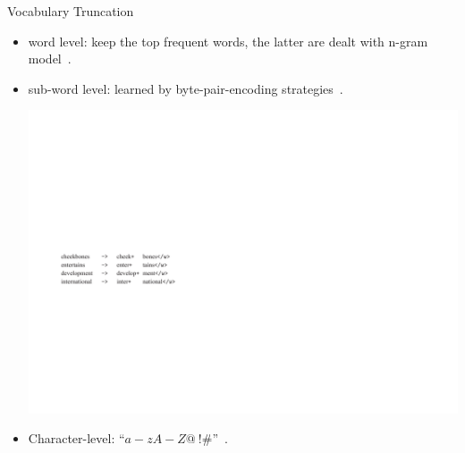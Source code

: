 \documentclass[english]{beamer} %
\begin{document}
\begin{frame}[<+->]{Vocabulary Truncation}
\begin{itemize}
  \item word level: keep the top frequent words, the latter are dealt with n-gram model~\cite{DBLP:journals/csl/Schwenk07}.
  \item sub-word level: learned by byte-pair-encoding strategies~\cite{DBLP:conf/acl/SennrichHB16a,Gage:1994:NAD:177910.177914}.
  \begin{center}
    \includegraphics[scale=0.7]{subword}
  \end{center}
  \item Character-level: ``$a-zA-Z@~!\#$''~\cite{DBLP:journals/corr/JozefowiczVSSW16}.
\end{itemize}
\end{frame}
\end{document}
